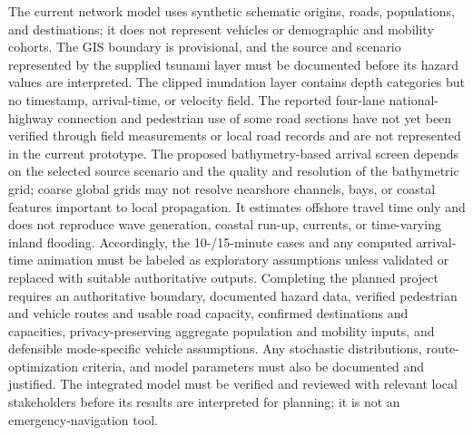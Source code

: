 \documentclass[conference]{IEEEtran}
\begin{document}
The current network model uses synthetic schematic origins, roads, populations, and destinations; it does not represent vehicles or demographic and mobility cohorts. The GIS boundary is provisional, and the source and scenario represented by the supplied tsunami layer must be documented before its hazard values are interpreted. The clipped inundation layer contains depth categories but no timestamp, arrival-time, or velocity field. The reported four-lane national-highway connection and pedestrian use of some road sections have not yet been verified through field measurements or local road records and are not represented in the current prototype. The proposed bathymetry-based arrival screen depends on the selected source scenario and the quality and resolution of the bathymetric grid; coarse global grids may not resolve nearshore channels, bays, or coastal features important to local propagation. It estimates offshore travel time only and does not reproduce wave generation, coastal run-up, currents, or time-varying inland flooding. Accordingly, the 10-/15-minute cases and any computed arrival-time animation must be labeled as exploratory assumptions unless validated or replaced with suitable authoritative outputs. Completing the planned project requires an authoritative boundary, documented hazard data, verified pedestrian and vehicle routes and usable road capacity, confirmed destinations and capacities, privacy-preserving aggregate population and mobility inputs, and defensible mode-specific vehicle assumptions. Any stochastic distributions, route-optimization criteria, and model parameters must also be documented and justified. The integrated model must be verified and reviewed with relevant local stakeholders before its results are interpreted for planning; it is not an emergency-navigation tool.
\end{document}
